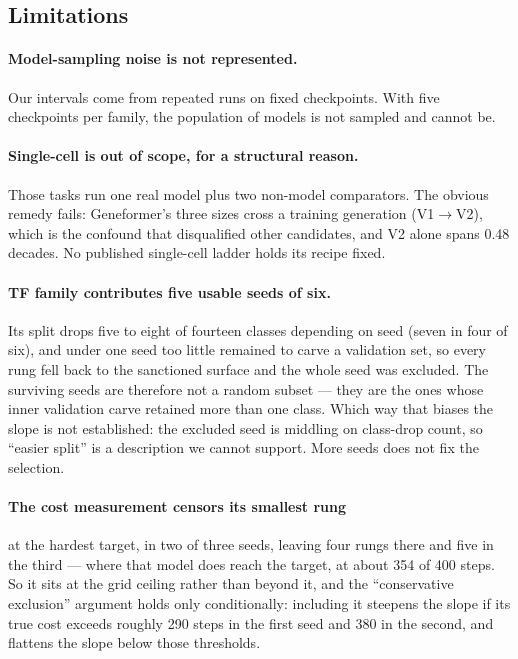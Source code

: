 \documentclass[11pt]{article}
\begin{document}
\subsection{Limitations}
\label{sec:lim}

\paragraph{Model-sampling noise is not represented.} Our intervals come from
repeated runs on fixed checkpoints. With five checkpoints per family, the
population of models is not sampled and cannot be.

\paragraph{Single-cell is out of scope, for a structural reason.} Those tasks run
one real model plus two non-model comparators. The obvious remedy fails:
Geneformer's three sizes cross a training generation (V1$\rightarrow$V2), which is
the confound that disqualified other candidates, and V2 alone spans 0.48 decades.
No published single-cell ladder holds its recipe fixed.

\paragraph{TF family contributes five usable seeds of six.} Its split drops five
to eight of fourteen classes depending on seed (seven in four of six), and under
one seed too little remained to carve a validation set, so every rung fell back to
the sanctioned surface and the whole seed was excluded. The surviving seeds are
therefore not a random subset --- they are the ones whose inner validation carve
retained more than one class. Which way that biases the slope is not established:
the excluded seed is middling on class-drop count, so ``easier split'' is a
description we cannot support. More seeds does not fix the selection.

\paragraph{The cost measurement censors its smallest rung} at the hardest target,
in two of three seeds, leaving four rungs there and five in the third --- where
that model does reach the target, at about 354 of 400 steps. So it sits at the
grid ceiling rather than beyond it, and the ``conservative exclusion'' argument
holds only conditionally: including it steepens the slope if its true cost exceeds
roughly 290 steps in the first seed and 380 in the second, and flattens the slope
below those thresholds.
\end{document}
